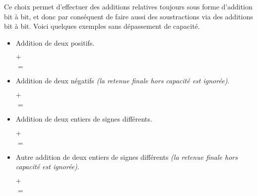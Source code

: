 Ce choix permet d'effectuer des additions relatives toujours sous forme d'addition bit à bit, et donc par conséquent de faire aussi des soustractions via des additions bit à bit. Voici quelques exemples sans dépassement de capacité.
\begin{itemize}[label=\small\textbullet]
	\medskip\item Addition de deux positifs.

		  \smallskip
		  
		  \noindent \phantom{$+$} 
	
		  \noindent          $+$  
	
		  \noindent          $=$  


	\medskip\item Addition de deux négatifs \emph{(la retenue finale hors capacité est ignorée)}.

		  \smallskip
		  
		  \noindent \phantom{$+$} 
	
		  \noindent          $+$  
	
		  \noindent          $=$  


	\medskip\item Addition de deux entiers de signes différents.

		  \smallskip
		  
		  \noindent \phantom{$+$} 
	
		  \noindent          $+$  
	
		  \noindent          $=$  


	\medskip\item Autre addition de deux entiers de signes différents \emph{(la retenue finale hors capacité est ignorée)}.

		  \smallskip
		  
		  \noindent \phantom{$+$} 
	
		  \noindent          $+$  
	
		  \noindent          $=$  
\end{itemize}
